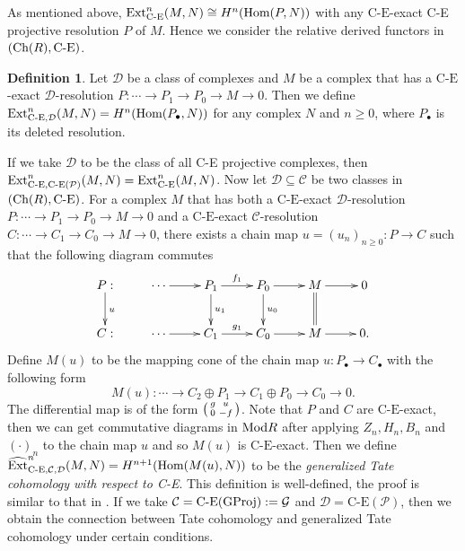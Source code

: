 \documentclass[reqno,12pt]{amsart}
\numberwithin{equation}{section}
\def\Ext{\mbox{\rm Ext}} \def\Tor{\mbox{\rm Tor}}\def\Hom{\mbox{\rm Hom}} \def\dim{\mbox{\rm dim}} \def\Iso{\mbox{\rm Iso}}
\def\dim{\mbox{\rm dim}}\def\Irr{\mbox{\rm Irr}}\def\rad{\mbox{\rm rad}}\def\fg{\mbox{\rm fg}}
\def\Ch{\mbox{\rm Ch}}
\theoremstyle{plain}
\theoremstyle{definition}
\newtheorem{definition}[theorem]{\bf Definition}
\newcommand{\CE}{\mathrm{C}\text{-}\mathrm{E}}
\begin{document}
As mentioned above, $\Ext^n_{\text{C-E}}(M,N)\cong H^n(\Hom(P,N))$ with any $\CE$-exact C-E projective resolution $P$ of $M$. Hence we consider the relative derived functors in $(\Ch (R), \text{C-E})$.

\begin{definition}
    Let $\mathcal{D}$ be a class of complexes and $M$ be a complex that has a $\CE$-exact $\mathcal{D}$-resolution $P:\cdots\to P_1\to P_0\to M\to 0$. Then we define $\Ext^n_{\CE,\mathcal{D}}(M,N)=H^n(\Hom(P_{\bullet},N))$ for any complex $N$ and $n\geq 0$, where $P_{\bullet}$ is its deleted resolution.
\end{definition}

If we take $\mathcal{D}$ to be the class of all C-E projective complexes, then $\Ext^n_{\text{C-E},\text{C-E}(\mathcal{P})}(M,N)=\Ext^n_{\text{C-E}}(M,N)$. Now let $\mathcal{D}\subseteq\mathcal{C}$ be two classes in $(\Ch (R), \text{C-E})$. For a complex $M$ that has both a $\CE$-exact $\mathcal{D}$-resolution $P:\cdots\to P_1\to P_0\to M\to 0$ and a $\CE$-exact $\mathcal{C}$-resolution $C:\cdots\to C_1\to C_0\to M\to 0$, there exists a chain map $u=(u_n)_{n\geq 0}:P\to C$ such that the following diagram commutes
$$\xymatrix{
   P: \ar[d]^{u} & \cdots \ar[r] & P_1 \ar[r]^{f_1} \ar[d]^{u_1} & P_0 \ar[r] \ar[d]^{u_0} & M \ar[r] \ar@{=}[d] & 0 \\
   C: & \cdots\ar[r] & C_1 \ar[r]^{g_1} & C_0 \ar[r] & M \ar[r] & 0.
}$$
Define $M(u)$ to be the mapping cone of the chain map
$u:P_{\bullet}\to C_{\bullet}$ with the following form
$$M(u): \cdots \to C_2\oplus P_1\to C_1\oplus P_0\to C_0\to 0.$$
The differential map is of the form $\left(\smqty{g&u\\0&-f}\right)$. Note that $P$ and $C$ are $\CE$-exact, then we can get commutative diagrams in $\mbox{\rm Mod} R$ after applying $Z_n, H_n, B_n$ and $(\cdot)_{n}$ to the chain map $u$ and so $M(u)$ is $\CE$-exact. Then we define $\widehat{\Ext}^n_{\text{C-E},\mathcal{C},\mathcal{D}}(M,N)=H^{n+1}(\Hom(M(u),N))$ to be the {\it generalized Tate cohomology with respect to C-E}. This definition is well-defined, the proof is similar to that in \cite{I05}. If we take $\mathcal{C}=\text{C-E}({\rm GProj}):=\mathcal{G}$ and $\mathcal{D}=\text{C-E}(\mathcal{P})$, then we obtain the connection between Tate cohomology and generalized Tate cohomology under certain conditions.
\end{document}
